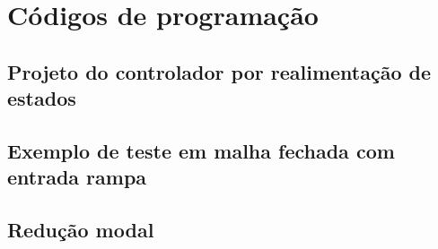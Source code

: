 \chapter{Códigos de programação}\label{apd:cdg}

\section{Projeto do controlador por realimentação de estados}


\section{Exemplo de teste em malha fechada com entrada rampa}


\section{Redução modal}
